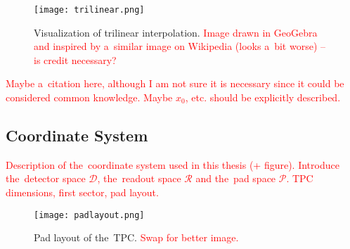 					\begin{figure}
						\centering
						\texttt{[image: trilinear.png]}
						\label{fig:trilin}
						\caption{Visualization of trilinear interpolation. \textcolor{red}{Image drawn in GeoGebra and inspired by a~similar image on Wikipedia (looks a~bit worse) -- is credit necessary?}}
					\end{figure}
				
				\textcolor{red}{Maybe a~citation here, although I am not sure it is necessary since it could be considered common knowledge. Maybe $x_0$, etc. should be explicitly described.}
		
		\subsection{Coordinate System}
		\label{sec:coor}
		\textcolor{red}{Description of the~coordinate system used in this thesis (+ figure). Introduce the~detector space $\mathcal{D}$, the~readout space $\mathcal{R}$ and the~pad space $\mathcal{P}$. TPC dimensions, first sector, pad layout.}
	
	\begin{figure}
		\centering
		\texttt{[image: padlayout.png]}
		\caption{Pad layout of the~TPC. \textcolor{red}{Swap for better image.}}
		\label{fig:padlayout}
	\end{figure}